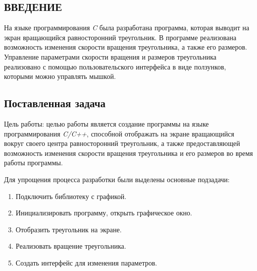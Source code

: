 \documentclass[14pt]{extarticle}
\begin{document}
{ %
    \begin{spacing}{1}
    \tableofcontents
    \end{spacing}
    \par
    \vfill
    \newpage
}
{ %
    \begin{spacing}{1.5}
    {
        \centering\section*{ВВЕДЕНИЕ}
        \par
    }
    На языке программирования \textit{C} была разработана программа, которая выводит на экран вращающийся равносторонний треугольник. В программе реализована возможность изменения скорости вращения треугольника, а также его размеров. Управление параметрами скорости вращения и размеров треугольника реализовано с помощью пользовательского интерфейса в виде ползунков, которыми можно управлять мышкой.\par
    \vspace{1em}
    {
        \subsection*{Поставленная задача}
        \par
    }
    Цель работы: целью работы является создание программы на языке программирования \textit{C/C++}, способной отображать на экране вращающийся вокруг своего центра равносторонний треугольник, а также предоставляющей возможность изменения скорости вращения треугольника и его размеров во время работы программы.
    \par
    Для упрощения процесса разработки были выделены основные подзадачи:\par
    \begin{enumerate}[itemsep=2pt, parsep=0pt, topsep=2pt]
        \item{Подключить библиотеку с графикой.}
        \item{Инициализировать программу, открыть графическое окно.}
        \item{Отобразить треугольник на экране.}
        \item{Реализовать вращение треугольника.}
        \item{Создать интерфейс для изменения параметров.}
    \end{enumerate}
    \par
    {
}
\end{spacing}}
\end{document}
